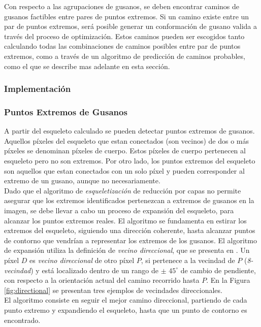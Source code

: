 Con respecto a las agrupaciones de gusanos, se deben encontrar caminos de gusanos factibles entre
pares de puntos extremos. Si un camino existe entre un par de puntos extremos, ser\'a posible
generar un conformaci\'on de gusano valida a trav\'es del proceso de optimizaci\'on. 
Estos caminos pueden ser escogidos tanto calculando todas las combinaciones de caminos posibles
entre par de puntos extremos, como a trav\'es de un algoritmo de predicci\'on de caminos probables,
como el que se describe mas adelante en esta secci\'on.

\subsubsection{Implementaci\'on}

\subsubsection*{Puntos Extremos de Gusanos}
\label{sec:wend}

A partir del esqueleto calculado se pueden detectar puntos extremos 
de gusanos. Aquellos p\'ixeles del esqueleto que estan conectados
(son vecinos) de dos o m\'as p\'ixeles se denominan p\'ixeles de cuerpo.
Estos p\'ixeles de cuerpo pertenecen al esqueleto pero no son extremos.
Por otro lado, los puntos extremos del esqueleto son aquellos que estan conectados con
un solo p\'ixel y pueden corresponder al extremo de un gusano, aunque no
necesariamente.\\

Dado que el algoritmo de \emph{esqueletizaci\'on} de reducci\'on por capas
no permite asegurar que los extremos identificados pertenezcan a extremos
de gusanos en la imagen, se debe llevar a cabo un proceso de expansi\'on
del esqueleto, para alcanzar los puntos extremos reales.
El algoritmo se fundamenta en estirar los extremos del esqueleto, siguiendo
una direcci\'on coherente, hasta alcanzar puntos de contorno que vendr\'ian a 
representar los extremos de los gusanos. El algoritmo de expansi\'on utiliza
la definici\'on de \emph{vecino direccional}, que se presenta en \cite[p.334]{maxima}.
Un p\'ixel $D$ es \emph{vecino direccional} de otro p\'ixel $P$, si pertenece a
la vecindad de $P$ (\emph{8-vecindad}) y est\'a localizado dentro de un rango de 
$\pm$ $45^{\circ}$  de cambio de pendiente, con respecto a la orientaci\'on actual
del camino recorrido hasta $P$. En la Figura \ref{fig:directional} se presentan 
tres ejemplos de vecindades direccionales.\\
El algoritmo consiste en seguir el mejor camino direccional, partiendo de cada
punto extremo y expandiendo el esqueleto, hasta que un punto de contorno es
encontrado.
 
